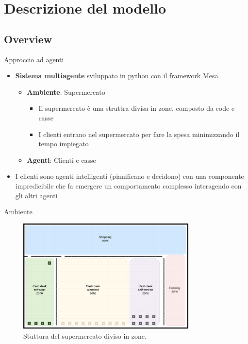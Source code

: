 \section{Descrizione del modello}

\subsection{Overview}
\begin{frame}{Approccio ad agenti}
	\begin{itemize}
		\item \textbf{Sistema multiagente} sviluppato in python con il framework Mesa
		\begin{itemize}
			\item \textbf{Ambiente}: Supermercato
			\begin{itemize}
				\item Il supermercato è una struttra divisa in zone, composto da code e casse
				\item I clienti entrano nel supermercato per fare la spesa minimizzando il tempo impiegato
			\end{itemize}
			\item \textbf{Agenti}: Clienti e casse
		\end{itemize}
	
		\item I clienti sono agenti intelligenti (pianificano e decidono) con una componente impredicibile che fa emergere un comportamento complesso interagendo con gli altri agenti
	\end{itemize}
\end{frame}

\begin{frame}{Ambiente}
	
	\begin{figure}[H]
		\centering
		\includegraphics[width=9cm]{"../report/images/supermarket-start-zones.png"}
		\caption{Stuttura del supermercato diviso in zone.}
		\label{fig:supermarket_zones}
	\end{figure}
	
	
\end{frame}


